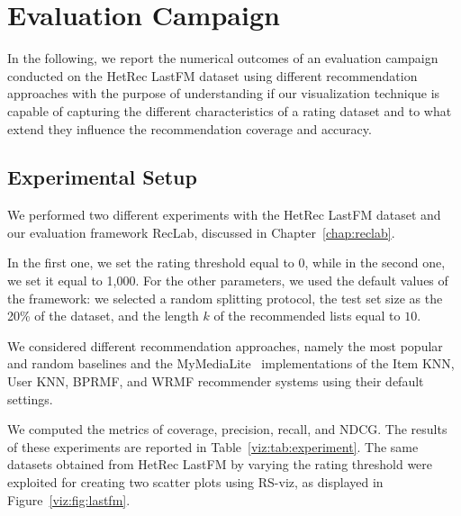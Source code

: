 \section{Evaluation Campaign}
\label{viz:sec:evaluation}

In the following, we report the numerical outcomes of an evaluation campaign conducted on the HetRec LastFM dataset using different recommendation approaches with the purpose of understanding if our visualization technique is capable of capturing the different characteristics of a rating dataset and to what extend they influence the recommendation coverage and accuracy.

\subsection{Experimental Setup}

We performed two different experiments with the HetRec LastFM dataset and our evaluation framework RecLab, discussed in Chapter~\ref{chap:reclab}.

In the first one, we set the rating threshold equal to 0, while in the second one, we set it equal to 1,000. For the other parameters, we used the default values of the framework: we selected a random splitting protocol, the test set size as the 20\% of the dataset, and the length $k$ of the recommended lists equal to $10$.

We considered different recommendation approaches, namely the most popular and random baselines and the MyMediaLite~\cite{Gantner2011} implementations of the Item KNN, User KNN, BPRMF, and WRMF recommender systems using their default settings.

We computed the metrics of coverage, precision, recall, and NDCG. The results of these experiments are reported in Table~\ref{viz:tab:experiment}. The same datasets obtained from HetRec LastFM by varying the rating threshold were exploited for creating two scatter plots using RS-viz, as displayed in Figure~\ref{viz:fig:lastfm}.

